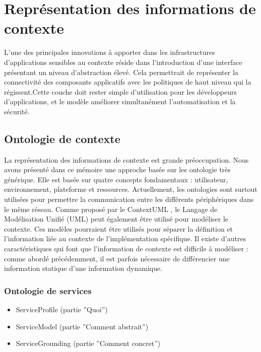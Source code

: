 \section{Représentation des informations de contexte}

L'une des principales innovations à apporter dans les infrastructures
d'applications sensibles au contexte réside dans l'introduction d'une interface
présentant un niveau d'abstraction élevé. Cela permettrait de représenter la
connectivité des composants applicatifs avec les politiques de haut niveau qui
la régissent.Cette couche doit rester simple d'utilisation pour les
développeurs d'applications, et le modèle améliorer simultanément
l'automatisation et la sécurité.

\subsection{Ontologie de contexte}

La représentation des informations de contexte est grande préoccupation. Nous
avons présenté dans ce mémoire une approche basée sur les ontologie très
générique. Elle est basée sur quatre concepts fondamentaux : utilisateur,
environnement, plateforme et ressources. Actuellement, les ontologies sont
surtout utilisées pour permettre la communication entre les différents
périphériques dans le même réseau. Comme proposé par le ContextUML
\cite{sheng_contextuml:_2005}, le Langage de Modélisation Unifié (UML) peut
également être utilisé pour modéliser le contexte. Ces modèles pourraient être
utilisés pour séparer la définition et l'information liée au contexte de
l'implémentation spécifique. Il existe d'autres caractéristiques qui font que
l'information de contexte est difficile à modéliser : comme abordé précédemment,
il est parfois nécessaire de différencier une information statique d'une
information dynamique.

\subsubsection{Ontologie de services}

\begin{itemize}
  \item ServiceProfile (partie ''Quoi'')
  \item ServiceModel (partie ''Comment abstrait'')
  \item ServiceGrounding (partie ''Comment concret'')
\end{itemize}

